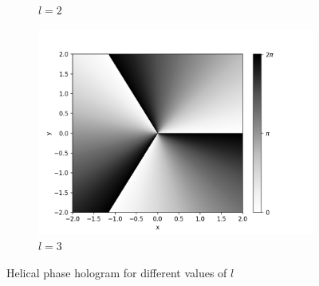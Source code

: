 \documentclass[11pt,a4paper]{article}
\numberwithin{equation}{section}
\begin{document}
\begin{figure}[H]
\begin{subfigure}[H]{0.3\textwidth}
		\caption{$l=2$}
		\label{fig:cgh,l=2}
	\end{subfigure}
	\hfil
	\begin{subfigure}[H]{0.3\textwidth}
		\centering
		\includegraphics[width=\textwidth]{cgh_l3.png}
		\caption{$l=3$}
		\label{fig:cgh,l=3}
	\end{subfigure}
	\caption{Helical phase hologram for different values of $l$}
	\label{fig:cgh}
\end{figure}
\end{document}
